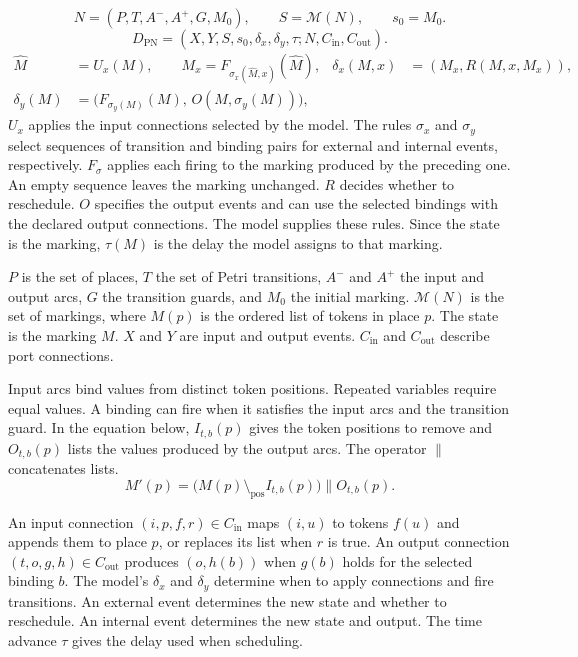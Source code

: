 \documentclass[11pt,a4paper]{article}
\newcommand{\chaptermark}[1]{\par\noindent{\LARGE\color{ink}\bfseries #1}\par\smallskip}
\begin{document}
\newpage
\chaptermark{2.3 \enspace DEVSPetriNet}
\begin{equation}\label{eq:devs-petri}
N=(P,T,A^-,A^+,G,M_0),\qquad
S=\mathcal M(N),\qquad s_0=M_0.
\end{equation}
\begin{equation}\label{eq:devs-petri-model}
D_{\mathrm{PN}}=(X,Y,S,s_0,\delta_x,\delta_y,\tau;
                  N,C_{\mathrm{in}},C_{\mathrm{out}}).
\end{equation}
\begin{align}
\widehat M &= U_x(M), \qquad M_x=F_{\sigma_x(\widehat M,x)}(\widehat M),
   &\delta_x(M,x)&=(M_x,R(M,x,M_x)),\label{eq:petri-delta-x}\\
\delta_y(M)&=\bigl(F_{\sigma_y(M)}(M),\,O(M,\sigma_y(M))\bigr),
   &&\label{eq:petri-delta-y}
\end{align}
$U_x$ applies the input connections selected by the model.
The rules $\sigma_x$ and $\sigma_y$ select sequences of transition and
binding pairs for external and internal events, respectively.
$F_\sigma$ applies each firing to the marking produced by the preceding
one. An empty sequence leaves the marking unchanged.
$R$ decides whether to reschedule. $O$ specifies the output events and
can use the selected bindings with the declared output connections.
The model supplies these rules. Since the state is the marking,
$\tau(M)$ is the delay the model assigns to that marking.

$P$ is the set of places, $T$ the set of Petri transitions, $A^-$ and
$A^+$ the input and output arcs, $G$ the transition guards, and $M_0$
the initial marking. $\mathcal M(N)$ is the set of markings, where
$M(p)$ is the ordered list of tokens in place $p$. The state is the marking $M$.
$X$ and $Y$ are input and output events. $C_{\mathrm{in}}$ and
$C_{\mathrm{out}}$ describe port connections.

Input arcs bind values from distinct token positions. Repeated variables
require equal values. A binding can fire when it satisfies the input arcs
and the transition guard. In the equation below, $I_{t,b}(p)$ gives the
token positions to remove and $O_{t,b}(p)$ lists the values produced by
the output arcs. The operator $\|$ concatenates lists.
\begin{equation}\label{eq:petri-fire}
M'(p)=\bigl(M(p)\setminus_{\mathrm{pos}} I_{t,b}(p)\bigr)
       \mathbin{\|} O_{t,b}(p).
\end{equation}


An input connection $(i,p,f,r)\in C_{\mathrm{in}}$ maps $(i,u)$ to
tokens $f(u)$ and appends them to place $p$, or replaces its list when
$r$ is true. An output connection $(t,o,g,h)\in C_{\mathrm{out}}$
produces $(o,h(b))$ when $g(b)$ holds for the selected binding $b$.
The model's $\delta_x$ and $\delta_y$ determine when to apply connections
and fire transitions. An external event determines the new state and
whether to reschedule. An internal event determines the new state and
output. The time advance $\tau$ gives the delay used when scheduling.
\end{document}
